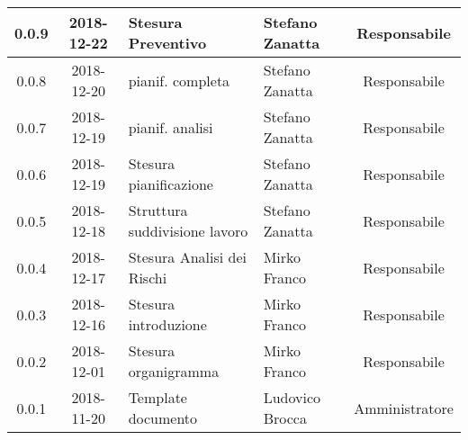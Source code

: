 \begin{center}
\begin{tabularx}{\textwidth}{|c|c|X|X|c|}
			\hline
			0.0.9 & 2018-12-22 & Stesura Preventivo & Stefano Zanatta & Responsabile\\
			\hline
			0.0.8 & 2018-12-20 & pianif. completa& Stefano Zanatta & Responsabile\\
			\hline
			0.0.7 & 2018-12-19 & pianif. analisi& Stefano Zanatta & Responsabile\\
			\hline
			0.0.6 & 2018-12-19 & Stesura pianificazione & Stefano Zanatta & Responsabile\\
			\hline
			0.0.5 & 2018-12-18 & Struttura suddivisione lavoro & Stefano Zanatta & Responsabile\\
			\hline
			0.0.4 & 2018-12-17 & Stesura Analisi dei Rischi & Mirko Franco & Responsabile\\
			\hline
			0.0.3 & 2018-12-16 & Stesura introduzione &Mirko Franco& Responsabile\\
			\hline
			0.0.2 & 2018-12-01 & Stesura organigramma &Mirko Franco& Responsabile\\
			\hline
			0.0.1 & 2018-11-20 & Template documento& Ludovico Brocca & Amministratore\\			
			\hline
			
		\end{tabularx}
	\end{center}
\newpage